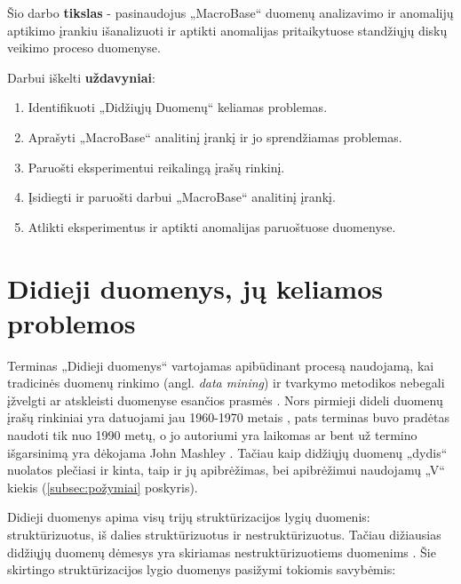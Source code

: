 \documentclass{VUMIFPSkursinis}
\begin{document}
Šio darbo \textbf{tikslas} - pasinaudojus „MacroBase“ duomenų analizavimo ir anomalijų aptikimo įrankiu išanalizuoti ir aptikti anomalijas pritaikytuose standžiųjų diskų veikimo proceso duomenyse.\par

Darbui iškelti \textbf{uždavyniai}:\par

\begin{enumerate}
\item Identifikuoti	 „Didžiųjų Duomenų“ keliamas problemas.
\item Aprašyti „MacroBase“ analitinį įrankį ir jo sprendžiamas problemas.
\item Paruošti eksperimentui reikalingą įrašų rinkinį.
\item Įsidiegti ir paruošti darbui „MacroBase“ analitinį įrankį.
\item Atlikti eksperimentus ir aptikti anomalijas paruoštuose duomenyse.
\end{enumerate}

\section{Didieji duomenys, jų keliamos problemos} \label{sec:bigdata}
Terminas „Didieji duomenys“ vartojamas apibūdinant procesą naudojamą, kai tradicinės duomenų rinkimo (angl. \textit{data mining}) ir tvarkymo metodikos nebegali įžvelgti ar atskleisti duomenyse esančios prasmės \cite{bigdata}. Nors pirmieji dideli duomenų įrašų rinkiniai yra datuojami jau 1960-1970 metais \cite{first_bigdata}, pats terminas buvo pradėtas naudoti tik nuo 1990 metų, o jo autoriumi yra laikomas ar bent už termino išgarsinimą yra dėkojama John Mashley \cite{john_1, john_2, john_3}. Tačiau kaip didžiųjų duomenų „dydis“ nuolatos plečiasi ir kinta, taip ir jų apibrėžimas, bei apibrėžimui naudojamų „V“ kiekis (\ref{subsec:požymiai} poskyris).\par

Didieji duomenys apima visų trijų struktūrizacijos lygių duomenis: struktūrizuotus, iš dalies struktūrizuotus ir nestruktūrizuotus. Tačiau dižiausias didžiųjų duomenų dėmesys yra skiriamas nestruktūrizuotiems duomenims \cite{bigdata_data_struct}. Šie skirtingo struktūrizacijos lygio duomenys pasižymi tokiomis savybėmis:
\end{document}
